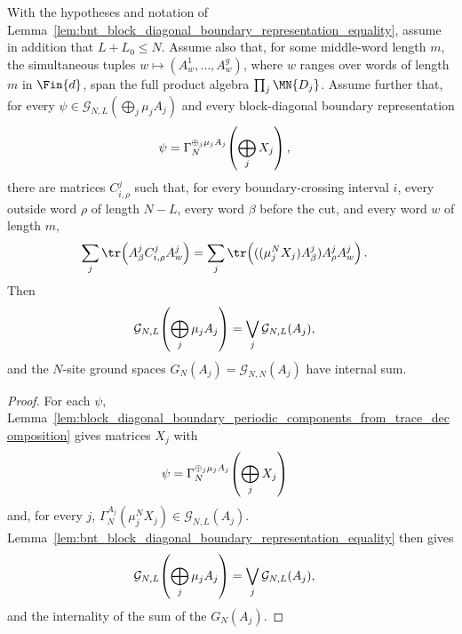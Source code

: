 \begin{lemma}
    \label{lem:bnt_block_diagonal_trace_decomposition_equality}
    \leanok
    With the hypotheses and notation of
    Lemma~\ref{lem:bnt_block_diagonal_boundary_representation_equality}, assume
    in addition that $L+L_0\le N$. Assume also that, for some middle-word length
    $m$, the simultaneous tuples $w\mapsto(A^1_w,\ldots,A^g_w)$, where $w$
    ranges over words of length $m$ in $\Fin{d}$, span the full product algebra
    $\prod_j\MN{D_j}$. Assume further that, for every
    $\psi\in\mathcal G_{N,L}\!\left(\bigoplus_j\mu_jA_j\right)$
    and every block-diagonal boundary representation
    \begin{align}
        \psi
         & =
        \Gamma_N^{\oplus_j\mu_jA_j}\!\left(\bigoplus_jX_j\right),
        \notag
    \end{align}
    there are matrices $C^j_{i,\rho}$ such that, for every
    boundary-crossing interval $i$, every outside word $\rho$ of length $N-L$,
    every word $\beta$ before the cut, and every word $w$ of length $m$,
    \begin{align}
        \sum_j\tr\!\left(A^j_\beta C^j_{i,\rho}A^j_w\right)
         & =
        \sum_j
        \tr\!\left(((\mu_j^N X_j)A^j_\beta)A^j_\rho A^j_w\right).
        \notag
    \end{align}
    Then
    \begin{align}
        \mathcal G_{N,L}\!\left(\bigoplus_j\mu_jA_j\right)
         & =
        \bigvee_j\mathcal G_{N,L}(A_j),
        \notag
    \end{align}
    and the $N$-site ground spaces $G_N(A_j)=\mathcal G_{N,N}(A_j)$
    have internal sum.
\end{lemma}

\begin{proof}
    \leanok
    For each $\psi$,
    Lemma~\ref{lem:block_diagonal_boundary_periodic_components_from_trace_decomposition}
    gives matrices $X_j$ with
    \begin{align}
        \psi
         & =
        \Gamma_N^{\oplus_j\mu_jA_j}\!\left(\bigoplus_jX_j\right)
        \notag
    \end{align}
    and, for every $j$,
    $\Gamma_N^{A_j}(\mu_j^N X_j)\in\mathcal G_{N,L}(A_j)$.
    Lemma~\ref{lem:bnt_block_diagonal_boundary_representation_equality}
    then gives
    \begin{align}
        \mathcal G_{N,L}\!\left(\bigoplus_j\mu_jA_j\right)
         & =
        \bigvee_j\mathcal G_{N,L}(A_j),
        \notag
    \end{align}
    and the internality of the sum of the $G_N(A_j)$.
\end{proof}

